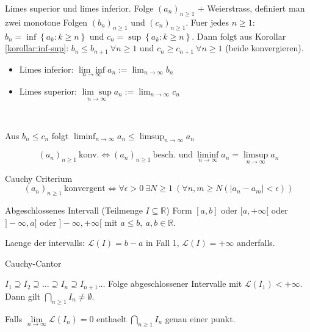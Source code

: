 \documentclass[8pt,a4paper,twocolumn]{extarticle}
\newcommand{\R}{\mathbb{R}}
\newcommand{\seq}[1]{\left( #1_n \right)_{n \ge 1}}
\begin{document}
\begin{definition}
    \par Limes superior und limes inferior.
    Folge $\seq{a}$ + Weierstrass, definiert man zwei monotone Folgen $\seq{b}$ und $\seq{c}$.
    Fuer jedes $n \ge 1$: $b_n = \inf \left\{ a_k : k \ge n \right\}$ und $c_n = \sup \left\{ a_k : k \ge n \right\}$.
    Dann folgt aus Korollar \ref{korollar:inf-sup}:
    $b_n \le b_{n + 1}\ \forall n \ge 1$ und $c_n \ge c_{n + 1}\ \forall n \ge 1$ (beide konvergieren).

    \begin{itemize}
        \item Limes inferior: $\underset{n \to \infty}{\lim \inf} a_n := \lim_{n \to \infty} b_n$
        \item Limes superior: $\underset{n \to \infty}{\lim \sup} a_n := \lim_{n \to \infty} c_n$
    \end{itemize}\

    Aus $b_n \le c_n$ folgt $\liminf_{n \to \infty} a_n \le \limsup_{n \to \infty} a_n$
\end{definition}

\begin{lemma}{2.19}
    \[
        \seq{a}\ \mbox{konv.} \Leftrightarrow \seq{a}\ \mbox{besch. und}\ \liminf_{n \to \infty} a_n = \limsup_{n \to \infty} a_n
    \]
\end{lemma}

\begin{satz}{2.20}
    \label{satz:cauchy-criterium-folge}
    \par Cauchy Criterium
    \[ \seq{a}\ \mbox{konvergent} \Leftrightarrow \forall \epsilon > 0\
    \exists N \ge 1\ \left( \forall n,m \ge N \left( \lvert a_n - a_m \rvert < \epsilon \right) \right) \]
\end{satz}

\begin{definition}{2.21}
    \par Abgeschlossenes Intervall (Teilmenge $I \subseteq \R$)
    Form $[a,b]$ oder $[a, +\infty[$ oder $]-\infty, a]$ oder $]-\infty, +\infty[$ mit $a \le b,\ a,b \in \R$.

    Laenge der intervalls: $\mathcal{L}(I) = b - a$ in Fall 1, $\mathcal{L}(I) = +\infty$ anderfalls.
\end{definition}

\begin{satz}{2.25}
    \label{satz:cauchy-cantor}
    \par Cauchy-Cantor

    $I_1 \supseteq I_2 \supseteq \dots \supseteq I_n \supseteq I_{n + 1} \dots$ Folge abgeschlossener Intervalle mit $\mathcal{L}(I_1) < +\infty$.
    Dann gilt $\bigcap_{n \ge 1} I_n \ne \emptyset$.

    Falls $\underset{n \to \infty}{\lim} \mathcal{L}(I_n) = 0$ enthaelt $\bigcap_{n \ge 1} I_n$ genau einer punkt.
\end{satz}
\end{document}
